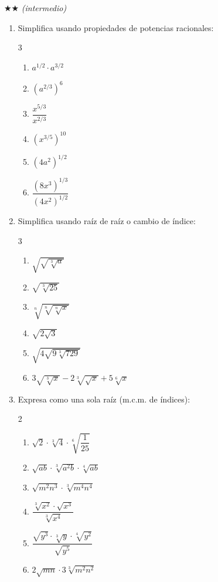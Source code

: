 \documentclass[11pt, letterpaper]{article}
\begin{document}
$\bigstar\bigstar$ \textit{(intermedio)}

\begin{enumerate}[label=\textbf{\arabic*.}, leftmargin=*, resume]
  \item Simplifica usando propiedades de potencias racionales:
  \begin{multicols}{3}
  \begin{enumerate}[label=\alph*)]
    \item $a^{1/2}\cdot a^{3/2}$
    \item $(a^{2/3})^6$
    \item $\dfrac{x^{5/3}}{x^{2/3}}$
    \item $(x^{3/5})^{10}$
    \item $(4a^2)^{1/2}$
    \item $\dfrac{(8x^3)^{1/3}}{(4x^2)^{1/2}}$
  \end{enumerate}
  \end{multicols}

  \item Simplifica usando raíz de raíz o cambio de índice:
  \begin{multicols}{3}
  \begin{enumerate}[label=\alph*)]
    \item $\sqrt{\sqrt{\sqrt[3]{a}}}$
    \item $\sqrt{\sqrt[3]{25}}$
    \item $\sqrt[n]{\sqrt[n]{\sqrt[n]{x}}}$
    \item $\sqrt{2\sqrt{3}}$
    \item $\sqrt{4\sqrt{9\sqrt[3]{729}}}$
    \item $3\sqrt{\sqrt[3]{x}}-2\sqrt[3]{\sqrt{x}}+5\sqrt[6]{x}$
  \end{enumerate}
  \end{multicols}

  \item Expresa como una sola raíz (m.c.m. de índices):
  \begin{multicols}{2}
  \begin{enumerate}[label=\alph*)]
    \item $\sqrt{2}\cdot\sqrt[3]{4}\cdot\sqrt[6]{\dfrac{1}{25}}$
    \item $\sqrt{ab}\cdot\sqrt[3]{a^2b}\cdot\sqrt[4]{ab}$
    \item $\sqrt{m^2n^3}\cdot\sqrt[3]{m^4n^4}$
    \item $\dfrac{\sqrt[3]{x^2}\cdot\sqrt{x^3}}{\sqrt[3]{x^4}}$
    \item $\dfrac{\sqrt{y^3}\cdot\sqrt[3]{y}\cdot\sqrt[4]{y^2}}{\sqrt{y^5}}$
    \item $2\sqrt{mn}\cdot 3\sqrt[3]{m^2n^2}$
  \end{enumerate}
  \end{multicols}
\end{enumerate}
\end{document}
